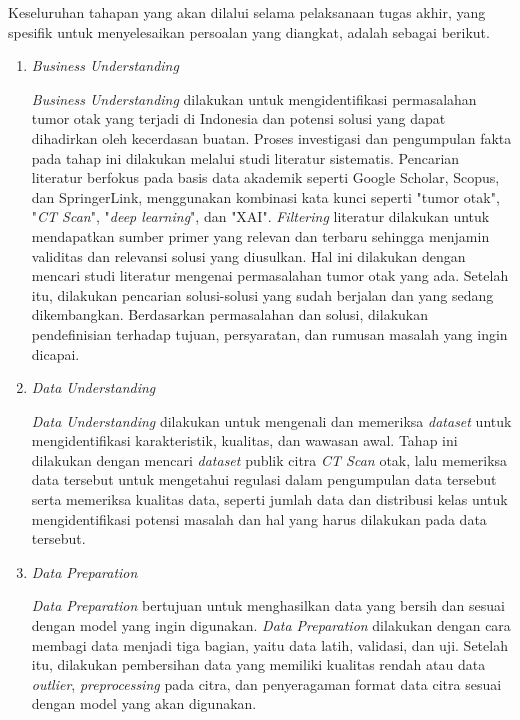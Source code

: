 Keseluruhan tahapan yang akan dilalui selama pelaksanaan tugas akhir, yang spesifik untuk menyelesaikan persoalan yang diangkat, adalah sebagai berikut.

\begin{enumerate}
	\item	\textit{Business Understanding}
	
	\textit{Business Understanding} dilakukan untuk mengidentifikasi permasalahan tumor otak yang terjadi di Indonesia dan potensi solusi yang dapat dihadirkan oleh kecerdasan buatan.
	Proses investigasi dan pengumpulan fakta pada tahap ini dilakukan melalui studi literatur sistematis. Pencarian literatur berfokus pada basis data akademik seperti Google Scholar, Scopus, dan SpringerLink, menggunakan kombinasi kata kunci seperti "tumor otak", "\textit{CT Scan}", "\textit{deep learning}", dan "XAI". \textit{Filtering} literatur dilakukan untuk mendapatkan sumber primer yang relevan dan terbaru sehingga menjamin validitas dan relevansi solusi yang diusulkan.
	Hal ini dilakukan dengan mencari studi literatur mengenai permasalahan tumor otak yang ada. Setelah itu, dilakukan pencarian solusi-solusi yang sudah berjalan dan yang sedang dikembangkan. Berdasarkan permasalahan dan solusi, dilakukan pendefinisian terhadap tujuan, persyaratan, dan rumusan masalah yang ingin dicapai.
	
	\item	\textit{Data Understanding}
	
	\textit{Data Understanding} dilakukan untuk mengenali dan memeriksa \textit{dataset} untuk mengidentifikasi karakteristik, kualitas, dan wawasan awal. Tahap ini dilakukan dengan mencari \textit{dataset} publik citra \textit{CT Scan} otak, lalu memeriksa data tersebut untuk mengetahui regulasi dalam pengumpulan data tersebut serta memeriksa kualitas data, seperti jumlah data dan distribusi kelas untuk mengidentifikasi potensi masalah dan hal yang harus dilakukan pada data tersebut.
	
	\item	\textit{Data Preparation}
	
	\textit{Data Preparation} bertujuan untuk menghasilkan data yang bersih dan sesuai dengan model yang ingin digunakan. \textit{Data Preparation} dilakukan dengan cara membagi data menjadi tiga bagian, yaitu data latih, validasi, dan uji. Setelah itu, dilakukan pembersihan data yang memiliki kualitas rendah atau data \textit{outlier}, \textit{preprocessing} pada citra, dan penyeragaman format data citra sesuai dengan model yang akan digunakan.
	

\end{enumerate}
